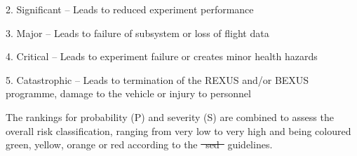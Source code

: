 \documentclass[ %
  a4paper, %
  11pt, %
  openany, %
  parskip, %
  toc=totoc, %
  listof=totoc, %
  bibliography=totoc %
]{scrreprt} %
\makeatletter
\providecommand{\DIFaddtex}[1]{{\protect\color{blue}\uwave{#1}}} %
\providecommand{\DIFdeltex}[1]{{\protect\color{red}\sout{#1}}} %
\providecommand{\DIFaddbegin}{} %
\providecommand{\DIFaddend}{} %
\providecommand{\DIFdelbegin}{} %
\providecommand{\DIFdelend}{} %
\providecommand{\DIFadd}[1]{\texorpdfstring{\DIFaddtex{#1}}{#1}} %
\providecommand{\DIFdel}[1]{\texorpdfstring{\DIFdeltex{#1}}{}} %
\providecommand{\DIFscaledelfig}{0.5}
\newlength{\DIFdelgraphicswidth} %
\newlength{\DIFdelgraphicsheight} %
\providecommand{\DIFaddincludegraphics}[2][]{{\color{blue}\fbox{\DIFOincludegraphics[#1]{#2}}}} %
\providecommand{\DIFdelincludegraphics}[2][]{%
\sbox{\DIFdelgraphicsbox}{\DIFOincludegraphics[#1]{#2}}%
\settoboxwidth{\DIFdelgraphicswidth}{\DIFdelgraphicsbox} %
\settoboxtotalheight{\DIFdelgraphicsheight}{\DIFdelgraphicsbox} %
\scalebox{\DIFscaledelfig}{%
\parbox[b]{\DIFdelgraphicswidth}{\usebox{\DIFdelgraphicsbox}\\[-\baselineskip] \rule{\DIFdelgraphicswidth}{0em}}\llap{\resizebox{\DIFdelgraphicswidth}{\DIFdelgraphicsheight}{%
\setlength{\unitlength}{\DIFdelgraphicswidth}%
\begin{picture}(1,1)%
\thicklines\linethickness{2pt} %
{\color[rgb]{1,0,0}\put(0,0){\framebox(1,1){}}}%
{\color[rgb]{1,0,0}\put(0,0){\line( 1,1){1}}}%
{\color[rgb]{1,0,0}\put(0,1){\line(1,-1){1}}}%
\end{picture}%
}\hspace*{3pt}}} %
} %
\DeclareRobustCommand{\DIFaddbegin}{\DIFOaddbegin \let\includegraphics\DIFaddincludegraphics} %
\DeclareRobustCommand{\DIFaddend}{\DIFOaddend \let\includegraphics\DIFOincludegraphics} %
\DeclareRobustCommand{\DIFdelbegin}{\DIFOdelbegin \let\includegraphics\DIFdelincludegraphics} %
\DeclareRobustCommand{\DIFdelend}{\DIFOaddend \let\includegraphics\DIFOincludegraphics} %
\let\sout@orig\sout %
\renewcommand{\sout}[1]{\ifmmode\text{\sout@orig{\ensuremath{#1}}}\else\sout@orig{#1}\fi} %
\providecommand{\ac}[1]{#1}
\providecommand{\ac}[1]{#1}
\makeatother
\begin{document}
2. Significant -- Leads to reduced experiment performance

3. Major -- Leads to failure of subsystem or loss of flight data

4. Critical -- Leads to experiment failure or creates minor health hazards

5. Catastrophic -- Leads to termination of the REXUS and/or BEXUS programme, damage to the vehicle or injury to personnel

The rankings for probability (P) and severity (S) are combined to assess the overall risk classification, ranging from very low to very high and being coloured green, yellow, orange or red according to the \DIFdelbegin \DIFdel{\mbox{%
\ac{sed} }\hskip0pt%
}\DIFdelend \DIFaddbegin \DIFadd{\mbox{%
\gls{sed} }\hskip0pt%
}\DIFaddend guidelines.
\end{document}
